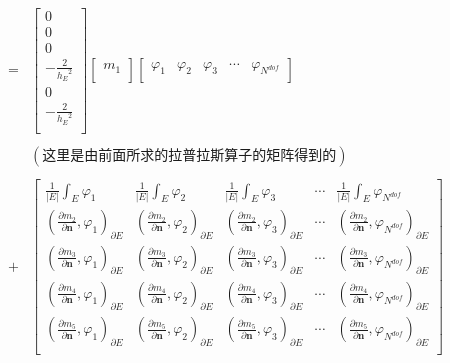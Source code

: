 \begin{equation*}
\begin{aligned}
= & \begin{bmatrix}
0 \\
0 \\
0 \\
-\frac{2}{{h_E}^2} \\
0 \\
-\frac{2}{{h_E}^2} \\
\end{bmatrix}
\begin{bmatrix}
m_1\\
\end{bmatrix}
\begin{bmatrix}
\varphi_1 & \varphi_2 & \varphi_3 & \cdots & \varphi_{N^{dof}}\\
\end{bmatrix}\\
\\
& (\text{这里是由前面所求的拉普拉斯算子的矩阵得到的}) \\
\\
+ & \begin{bmatrix}
\frac{1}{|E|} \int_E \varphi_1 & \frac{1}{|E|} \int_E \varphi_2 & \frac{1}{|E|} \int_E \varphi_3 & \cdots & \frac{1}{|E|} \int_E \varphi_{N^{dof}}\\
(\frac{ \partial m_2}{\partial \mathbf n},\varphi_1)_{\partial E} & (\frac{ \partial m_2}{\partial \mathbf n},\varphi_2)_{\partial E} & (\frac{ \partial m_2}{\partial \mathbf n},\varphi_3)_{\partial E} & \cdots & (\frac{\partial m_2}{\partial \mathbf n},\varphi_{N^{dof}})_{\partial E}\\
(\frac{\partial m_{3}}{\partial \mathbf n}, \varphi_1)_{\partial E} & (\frac{\partial m_{3}}{\partial \mathbf n}, \varphi_2)_{\partial E} & (\frac{\partial m_{3}}{\partial \mathbf n}, \varphi_3)_{\partial E} & \cdots & (\frac{\partial m_{3}}{\partial \mathbf n}, \varphi_{N^{dof}})_{\partial E}\\
(\frac{\partial m_{4}}{\partial \mathbf n}, \varphi_1)_{\partial E} & (\frac{\partial m_{4}}{\partial \mathbf n}, \varphi_2)_{\partial E} & (\frac{\partial m_{4}}{\partial \mathbf n}, \varphi_3)_{\partial E} & \cdots & (\frac{\partial m_{4}}{\partial \mathbf n}, \varphi_{N^{dof}})_{\partial E}\\
(\frac{\partial m_{5}}{\partial \mathbf n}, \varphi_1)_{\partial E} & (\frac{\partial m_{5}}{\partial \mathbf n}, \varphi_2)_{\partial E} & (\frac{\partial m_{5}}{\partial \mathbf n}, \varphi_3)_{\partial E} & \cdots & (\frac{\partial m_{5}}{\partial \mathbf n}, \varphi_{N^{dof}})_{\partial E}\\

\end{bmatrix}
\end{aligned}
\end{equation*}
